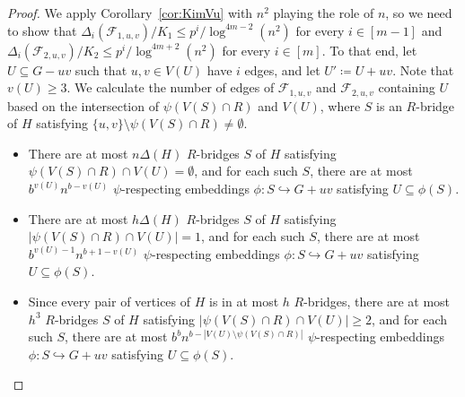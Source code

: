 \documentclass[11pt]{article}
\numberwithin{equation}{section}
\newcounter{i}
\theoremstyle{plain}
\theoremstyle{plain} %
\theoremstyle{definition}
\newcommand{\cF}{\mathcal{F}}
\begin{document}
\begin{proof}
We apply Corollary~\ref{cor:KimVu} with $n^2$ playing the role of $n$, so we need to show that $\Delta_i(\cF_{1,u,v}) / K_1 \leq p^i /  \log^{4m-2}(n^2)$ for every $i \in [m - 1]$ and $\Delta_i(\cF_{2,u,v}) / K_2 \leq p^i /  \log^{4m+2}(n^2)$ for every $i \in [m]$.  
To that end, let $U \subseteq G - uv$ such that $u,v\in V(U)$ have $i$ edges, and let $U' \coloneqq U + uv$.  Note that $v(U) \geq 3$.  We calculate the number of edges of $\cF_{1,u,v}$ and $\cF_{2,u,v}$ containing $U$ based on the intersection of $\psi(V(S) \cap R)$ and $V(U)$, where $S$ is an $R$-bridge of $H$ satisfying $\{u,v\}\setminus \psi(V(S)\cap R) \neq \emptyset$.
\begin{itemize}
    \item There are at most $n\Delta(H)$ $R$-bridges $S$ of $H$ satisfying $\psi(V(S) \cap R) \cap V(U) = \emptyset$, and for each such $S$, there are at most $b^{v(U)}n^{b - v(U)}$ $\psi$-respecting embeddings $\phi : S \hookrightarrow G+uv$ satisfying $U \subseteq \phi(S)$.
    \item There are at most $h\Delta(H)$ $R$-bridges $S$ of $H$ satisfying $|\psi(V(S) \cap R) \cap V(U)| = 1$, and for each such $S$, there are at most $b^{v(U)-1}n^{b + 1 - v(U)}$ $\psi$-respecting embeddings $\phi : S \hookrightarrow G+uv$ satisfying $U \subseteq \phi(S)$. 
    \item Since every pair of vertices of $H$ is in at most $h$ $R$-bridges, there are at most $h^3$ $R$-bridges $S$ of $H$ satisfying $|\psi(V(S) \cap R) \cap V(U)| \geq 2$, and for each such $S$, there are at most $b^{b}n^{b - |V(U)\setminus \psi(V(S)\cap R)|}$ $\psi$-respecting embeddings $\phi : S \hookrightarrow G+uv$ satisfying $U \subseteq \phi(S)$.
\end{itemize}


\end{proof}
\end{document}
